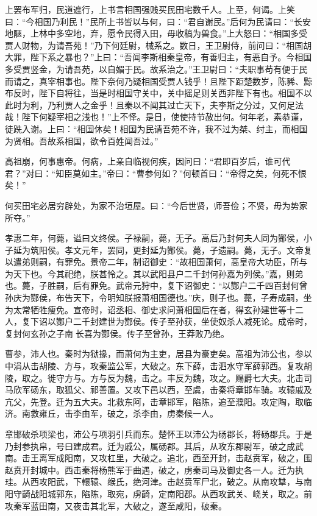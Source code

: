 \documentclass[]{article}
\begin{document}
上罢布军归，民道遮行，上书言相国强贱买民田宅数千人。上至，何谒。上笑曰：``今相国乃利民！''民所上书皆以与何，曰：``君自谢民。''后何为民请曰：``长安地陿，上林中多空地，弃，愿令民得入田，毋收稿为兽食。''上大怒曰：``相国多受贾人财物，为请吾苑！''乃下何廷尉，械系之。数日，王卫尉侍，前问曰：``相国胡大罪，陛下系之暴也？''上曰：``吾闻李斯相秦皇帝，有善归主，有恶自予。今相国多受贾竖金，为请吾苑，以自媚于民。故系治之。''王卫尉曰：``夫职事苟有便于民而请之，真宰相事也。陛下奈何乃疑相国受贾人钱乎！且陛下距楚数岁，陈豨、黥布反时，陛下自将往，当是时相国守关中，关中摇足则关西非陛下有也。相国不以此时为利，乃利贾人之金乎！且秦以不闻其过亡天下，夫李斯之分过，又何足法哉！陛下何疑宰相之浅也！''上不怿。是日，使使持节赦出何。何年老，素恭谨，徒跣入谢。上曰：``相国休矣！相国为民请吾苑不许，我不过为桀、纣主，而相国为贤相。吾故系相国，欲令百姓闻吾过。''

高祖崩，何事惠帝。何病，上亲自临视何疾，因问曰：``君即百岁后，谁可代君？''对曰：``知臣莫如主。''帝曰：``曹参何如？''何顿首曰：``帝得之矣，何死不恨矣！''

何买田宅必居穷辟处，为家不治垣屋。曰：``今后世贤，师吾俭；不贤，毋为势家所夺。''

孝惠二年，何薨，谥曰文终侯。子禄嗣，薨，无子。高后乃封何夫人同为酂侯，小子延为筑阳侯。孝文元年，罢同，更封延为酂侯。薨，子遗嗣。薨，无子。文帝复以遣弟则嗣，有罪免。景帝二年，制诏御史：``故相国萧何，高皇帝大功臣，所与为天下也。今其祀绝，朕甚怜之。其以武阳县户二千封何孙嘉为列侯。''嘉，则弟也。薨，子胜嗣，后有罪免。武帝元狩中，复下诏御史：``以酂户二千四百封何曾孙庆为酂侯，布告天下，令明知朕报萧相国德也。''庆，则子也。薨，子寿成嗣，坐为太常牺牲瘦免。宣帝时，诏丞相、御史求问萧相国后在者，得玄孙建世等十二人，复下诏以酂户二千封建世为酂侯。传子至孙获，坐使奴杀人减死论。成帝时，复封何玄孙之子南长喜为酂侯。传子至曾孙，王莽败乃绝。

曹参，沛人也。秦时为狱掾，而萧何为主吏，居县为豪吏矣。高祖为沛公也，参以中涓从击胡陵、方与，攻秦监公军，大破之。东下薛，击泗水守军薛郭西。复攻胡陵，取之。徙守方与。方与反为魏，击之。丰反为魏，攻之。赐爵七大夫。北击司马欣军砀东，取狐父、祁善置。又攻下邑以西，至虞，击秦将章邯车骑。攻辕戚及亢父，先登。迁为五大夫。北救东阿，击章邯军，陷陈，追至濮阳。攻定陶，取临济。南救雍丘，击李由军，破之，杀李由，虏秦候一人。

章邯破杀项梁也，沛公与项羽引兵而东。楚怀王以沛公为砀郡长，将砀郡兵。于是乃封参执帛，号曰建成君。迁为戚公，属砀郡。其后，从攻东郡尉军，破之成武南。击王离军成阳南，又攻杠里，大破之。追北，西至开封，击赵贲军，破之，围赵贲开封城中。西击秦将杨熊军于曲遇，破之，虏秦司马及御史各一人。迁为执珪。从西攻阳武，下轘辕、缑氏，绝河津。击赵贲军尸北，破之。从南攻犨，与南阳守齮战阳城郭东，陷陈，取宛，虏齮，定南阳郡。从西攻武关、峣关，取之。前攻秦军蓝田南，又夜击其北军，大破之，遂至咸阳，破秦。
\end{document}

